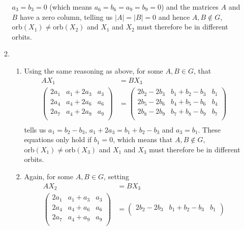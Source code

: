 \documentclass[10pt]{article}
\begin{document}
\begin{enumerate}
\begin{enumerate}
        $a_3 = b_3 = 0$ (which means $a_6 = b_6 = a_9 = b_9 = 0$) and the
        matrices $A$ and $B$ have a zero column, telling us $|A| = |B| = 0$ and
        hence $A, B \not \in G$, $ \text{orb}(X_1) \not = \text{orb}(X_2)$ and
        $X_1$ and $X_2$ must therefore be in different orbits.
      \item
        \begin{enumerate}
          \item Using the same reasoning as above, for some $A, B \in G$, that
          \begin{align*}
            A X_1 &= B X_3 \\
            \begin{pmatrix}
            2a_1 & a_1 + 2a_3 & a_3 \\
            2a_4 & a_4 + 2a_6 & a_6 \\
            2a_7 & a_4 + 2a_9 & a_9 \\
            \end{pmatrix}
              &=
            \begin{pmatrix}
            2b_2 - 2b_3 & b_1 + b_2 - b_3 & b_1 \\
            2b_5 - 2b_6 & b_4 + b_5 - b_6 & b_4 \\
            2b_8 - 2b_9 & b_7 + b_8 - b_9 & b_7 \\
            \end{pmatrix} \\
          \end{align*}
          tells us $a_1 = b_2 - b_3$, $a_1 + 2a_3 = b_1 + b_2 - b_3$ and $a_3 =
            b_1$. These equations only hold if $b_1 = 0$, which means that $A,
            B \not\in G$, $ \text{orb}(X_1) \not = \text{orb}(X_3)$ and $X_1$
            and $X_3$ must therefore be in different orbits.
          \item Again, for some $A, B \in G$, setting
          \begin{align*}
            A X_2 &= B X_3 \\
            \begin{pmatrix}
            2a_1 & a_1 + a_3 & a_3 \\
            2a_4 & a_4 + a_6 & a_6 \\
            2a_7 & a_4 + a_9 & a_9 \\
            \end{pmatrix}
              &=
            \begin{pmatrix}
            2b_2 - 2b_3 & b_1 + b_2 - b_3 & b_1 \\

\end{pmatrix}
\end{align*}
\end{enumerate}
\end{enumerate}
\end{enumerate}
\end{document}
